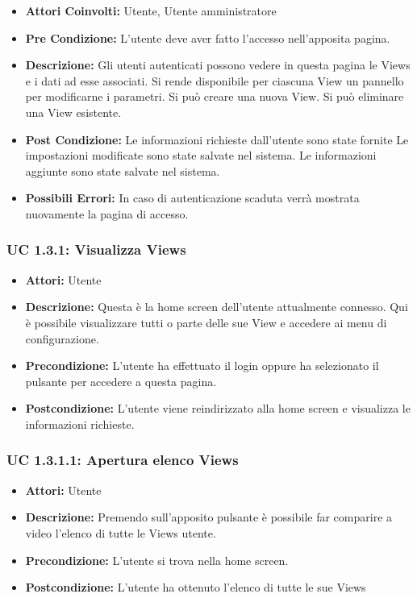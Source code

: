 \begin{itemize}
\item \textbf{Attori Coinvolti:} Utente, Utente amministratore
\item \textbf{Pre Condizione:} L’utente deve aver fatto l’accesso nell’apposita pagina.

\item \textbf{Descrizione:} Gli utenti autenticati possono vedere in questa pagina le Views e i dati ad esse associati. 
Si rende disponibile per ciascuna View un pannello per modificarne i parametri. 
Si può creare una nuova View. 
Si può eliminare una View esistente.

\item \textbf{Post Condizione:}
Le informazioni richieste dall'utente sono state fornite
Le impostazioni modificate sono state salvate nel sistema.
Le informazioni aggiunte sono state salvate nel sistema.

\item \textbf{Possibili Errori:}    
In caso di autenticazione scaduta verrà mostrata nuovamente la pagina di accesso.
\end{itemize}

\subsubsection{UC 1.3.1: Visualizza Views}

\begin{itemize}
\item \textbf{Attori:} Utente
\item \textbf{Descrizione:} Questa è la home screen dell'utente attualmente connesso. Qui è possibile visualizzare tutti o parte delle sue View e accedere ai menu di configurazione.
\item \textbf{Precondizione:} L'utente ha effettuato il login oppure ha selezionato il pulsante per accedere a questa pagina.
\item \textbf{Postcondizione:} L'utente viene reindirizzato alla home screen e visualizza le informazioni richieste.
\end{itemize}

\subsubsection{UC 1.3.1.1: Apertura elenco Views}

\begin{itemize}
\item \textbf{Attori:} Utente
\item \textbf{Descrizione:} Premendo sull'apposito pulsante è possibile far comparire a video l'elenco di tutte le Views utente.
\item \textbf{Precondizione:} L'utente si trova nella home screen.
\item \textbf{Postcondizione:} L'utente ha ottenuto l'elenco di tutte le sue Views
\end{itemize}

